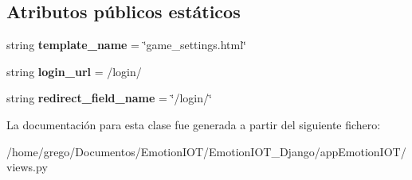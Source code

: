 \subsection*{Atributos públicos estáticos}
\begin{DoxyCompactItemize}
\item 
string {\bfseries template\+\_\+name} = \char`\"{}game\+\_\+settings.\+html\char`\"{}\hypertarget{classappEmotionIOT_1_1views_1_1Game__settings_ada4142faf95ae97b9ac865e5e00c4a4d}{}\label{classappEmotionIOT_1_1views_1_1Game__settings_ada4142faf95ae97b9ac865e5e00c4a4d}

\item 
string {\bfseries login\+\_\+url} = \textquotesingle{}/login/\textquotesingle{}\hypertarget{classappEmotionIOT_1_1views_1_1Game__settings_a6618493422acb2155fbb71117e440e3f}{}\label{classappEmotionIOT_1_1views_1_1Game__settings_a6618493422acb2155fbb71117e440e3f}

\item 
string {\bfseries redirect\+\_\+field\+\_\+name} = \char`\"{}/login/\char`\"{}\hypertarget{classappEmotionIOT_1_1views_1_1Game__settings_a958ba86ba869749b5543a7a863f27611}{}\label{classappEmotionIOT_1_1views_1_1Game__settings_a958ba86ba869749b5543a7a863f27611}

\end{DoxyCompactItemize}


La documentación para esta clase fue generada a partir del siguiente fichero\+:\begin{DoxyCompactItemize}
\item 
/home/grego/\+Documentos/\+Emotion\+I\+O\+T/\+Emotion\+I\+O\+T\+\_\+\+Django/app\+Emotion\+I\+O\+T/views.\+py\end{DoxyCompactItemize}

